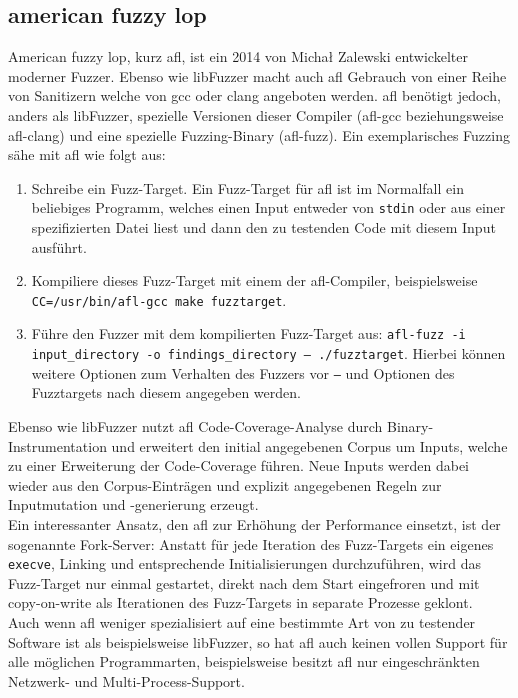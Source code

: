 \documentclass[a4paper]{article}
\begin{document}
\subsection{american fuzzy lop}
American fuzzy lop\cite{afl}, kurz afl, ist ein 2014 von Michał Zalewski entwickelter moderner Fuzzer. 
Ebenso wie libFuzzer macht auch afl Gebrauch von einer Reihe von Sanitizern welche von gcc oder clang angeboten werden. 
afl benötigt jedoch, anders als libFuzzer, spezielle Versionen dieser Compiler (afl-gcc beziehungsweise afl-clang) und eine spezielle Fuzzing-Binary (afl-fuzz).
Ein exemplarisches Fuzzing sähe mit afl wie folgt aus:
\begin{enumerate}
    \item Schreibe ein Fuzz-Target. Ein Fuzz-Target für afl ist im Normalfall ein beliebiges Programm, welches einen Input entweder von \texttt{stdin} oder aus einer spezifizierten Datei liest und dann den zu testenden Code mit diesem Input ausführt.
    \item Kompiliere dieses Fuzz-Target mit einem der afl-Compiler, beispielsweise \texttt{CC=/usr/bin/afl-gcc make fuzztarget}.
    \item Führe den Fuzzer mit dem kompilierten Fuzz-Target aus: \texttt{afl-fuzz -i input\_directory -o findings\_directory -- ./fuzztarget}. Hierbei können weitere Optionen zum Verhalten des Fuzzers vor \texttt{--} und Optionen des Fuzztargets nach diesem angegeben werden.
\end{enumerate}
Ebenso wie libFuzzer nutzt afl Code-Coverage-Analyse durch Binary-Instrumentation und erweitert den initial angegebenen Corpus um Inputs, welche zu einer Erweiterung der Code-Coverage führen. 
Neue Inputs werden dabei wieder aus den Corpus-Einträgen und explizit angegebenen Regeln zur Inputmutation und -generierung erzeugt.\\
Ein interessanter Ansatz, den afl zur Erhöhung der Performance einsetzt, ist der sogenannte Fork-Server\cite{afl}: Anstatt für jede Iteration des Fuzz-Targets ein eigenes \texttt{execve}, Linking und entsprechende Initialisierungen durchzuführen, wird das Fuzz-Target nur einmal gestartet, direkt nach dem Start eingefroren und mit copy-on-write als Iterationen des Fuzz-Targets in separate Prozesse geklont.\\
Auch wenn afl weniger spezialisiert auf eine bestimmte Art von zu testender Software ist als beispielsweise libFuzzer, so hat afl auch keinen vollen Support für alle möglichen Programmarten, beispielsweise besitzt afl nur eingeschränkten Netzwerk- und Multi-Process-Support.
\end{document}
